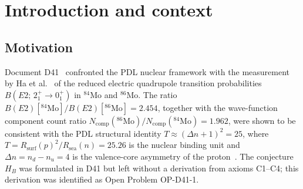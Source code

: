 \documentclass[11pt,a4paper]{article}
\theoremstyle{definition}
\theoremstyle{remark}
\newcommand{\PDL}{\textsc{pdl}}
\newcommand{\Rsurf}{R_{\mathrm{surf}}}
\newcommand{\Rsea}{R_{\mathrm{sea}}}
\newcommand{\Tpdl}{T}
\newcommand{\Dn}{\Delta n}
\newcommand{\nuu}{n_u}
\newcommand{\ndd}{n_d}
\newcommand{\Ncomp}{N_{\mathrm{comp}}}
\newcommand{\kph}{k\text{p-}k\text{h}}
\begin{document}
\begin{abstract}
The Projective Dynamic Logo (\PDL) framework derives nuclear structure from four combinatorial axioms on finite signed graphs~\cite{PDL_D01,PDL_D02}. Document D41~\cite{PDL_D41} introduced the closure multiplicity conjecture $H_B$: for a nucleus at the boundary of an island of nuclear inversion dominated by a $\kph$ intruder configuration, the number of maximal partial closures on the proton--neutron interface surface scales as $\Ncomp(k) = k$. The present document provides a complete proof of this scaling law from axioms C1--C4, without any free parameter. The proof rests on three lemmas: (L1) uniqueness of the maximal closure on a single interface unit (D16a); (L2) disjointness of the mixed-triangle sets of $k$ distinct $(A)\wedge(B)$ couplings (D29); (L3) C3-irreducibility of $k$ independent interface copies. Together these lemmas establish that $\Ncomp(k) = k$ exactly. Numerical verification is provided for $k = 1, \ldots, 5$ via the companion Python script. The separate question of whether $B(E2) \propto \Ncomp(k)$ follows from C1--C4 (Open Problem OP-D41-1-B) is identified as requiring the formal identification of the $E2$ multipole operator in the PDL relational framework, and is left as an explicit open problem.
\end{abstract}

\clearpage

\tableofcontents

\clearpage

\section{Introduction and context}
\label{sec:intro}

\subsection{Motivation}

Document D41~\cite{PDL_D41} confronted the PDL nuclear framework with the measurement by Ha et al.~\cite{Ha_2025} of the reduced electric quadrupole transition probabilities $B(E2;\,2^+_1 \to 0^+_1)$ in $^{84}$Mo and $^{86}$Mo. The ratio $B(E2)[^{84}\text{Mo}]/B(E2)[^{86}\text{Mo}] = 2.454$, together with the wave-function component count ratio $N_{\mathrm{comp}}(^{86}\text{Mo})/N_{\mathrm{comp}}(^{84}\text{Mo}) = 1.962$, were shown to be consistent with the PDL structural identity $\Tpdl \approx (\Dn+1)^2 = 25$, where $\Tpdl = \Rsurf(p)^2/\Rsea(n) = 25.26$ is the nuclear binding unit and $\Dn = \ndd - \nuu = 4$ is the valence-core asymmetry of the proton~\cite{PDL_D22,PDL_D40}. The conjecture $H_B$ was formulated in D41 but left without a derivation from axioms C1--C4; this derivation was identified as Open Problem OP-D41-1.
\end{document}
